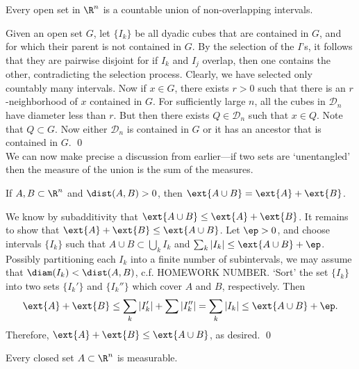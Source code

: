 \begin{lem} \label{lem:tiling}
Every open set in $\R^n$ is a countable union of non-overlapping intervals. 
\end{lem}

\pf Given an open set $G$, let $\{I_k\}$ be all dyadic cubes that are contained in $G$, and for which their parent is not contained in $G$. By the selection of the $I$'s, it follows that they are pairwise disjoint for if $I_k$ and $I_j$ overlap, then one contains the other, contradicting the selection process. Clearly, we have selected only countably many intervals. Now if $x \in G$, there exists $r>0$ such that there is an $r$-neighborhood of $x$ contained in $G$. For sufficiently large $n$, all the cubes in $\mathcal{D}_n$ have diameter less than $r$. But then there exists $Q \in \mathcal{D}_n$ such that $x \in Q$. Note that $Q \subset G$. Now either $\mathcal{D}_n$ is contained in $G$ or it has an ancestor that is contained in $G$. \qed \\



We can now make precise a discussion from earlier---if two sets are `unentangled' then the measure of the union is the sum of the measures. 


\begin{lem} \label{lem:omaddjs}
If $A, B \subset \R^n$ and $\dist(A,B)>0$, then $\ext{A \cup B}= \ext{A}+\ext{B}$. 
\end{lem}

\pf We know by subadditivity that $\ext{A \cup B} \leq \ext{A}+\ext{B}$. It remains to show that $\ext{A}+\ext{B} \leq \ext{A \cup B}$. Let $\ep>0$, and choose intervals $\{I_k\}$ such that $A \cup B \subset \bigcup_k I_k$ and $\sum_k |I_k| \leq \ext{A \cup B} + \ep$. Possibly partitioning each $I_k$ into a finite number of subintervals, we may assume that $\diam(I_k)<\dist(A,B)$, c.f. HOMEWORK NUMBER. `Sort' the set $\{I_k\}$ into two sets $\{I_k'\}$ and $\{I_k''\}$ which cover $A$ and $B$, respectively. Then
	\[
	\ext{A}+\ext{B} \leq \sum_k |I_k'| + \sum |I_k''| = \sum_k |I_k| \leq \ext{A \cup B} + \ep.
	\]
Therefore, $\ext{A} + \ext{B} \leq \ext{A \cup B}$, as desired. \qed \\



\begin{thm} \label{thm:closedmeas}
Every closed set $A \subset \R^n$ is measurable. 
\end{thm}

